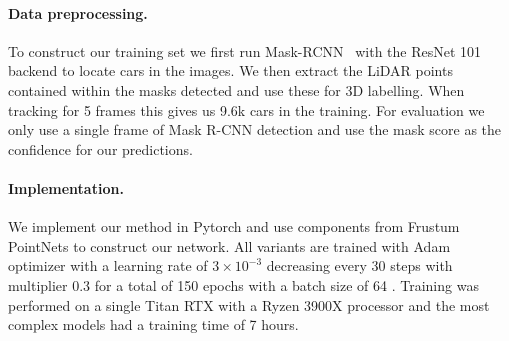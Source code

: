 
\paragraph{Data preprocessing.}

To construct our training set we first run Mask-RCNN~\cite{he17mask,wu2019detectron2} with the ResNet 101 backend to locate cars in the images.
We then extract the LiDAR points contained within the masks detected and use these for 3D labelling.
When tracking for 5 frames this gives us 9.6k cars in the training.
For evaluation we only use a single frame of Mask R-CNN detection and use the mask score as the confidence for our predictions.

\paragraph{Implementation.}

We implement our method in Pytorch\cite{NEURIPS2019_9015} and use components from Frustum PointNets\cite{qi2017frustum} to construct our network.
All variants are trained with Adam optimizer with a learning rate of $3\times 10^{-3}$ decreasing every 30 steps with multiplier $0.3$ for a total of 150 epochs with a batch size of 64 .
Training was performed on a single Titan RTX with a Ryzen 3900X processor and the most complex models had a training time of 7 hours.


